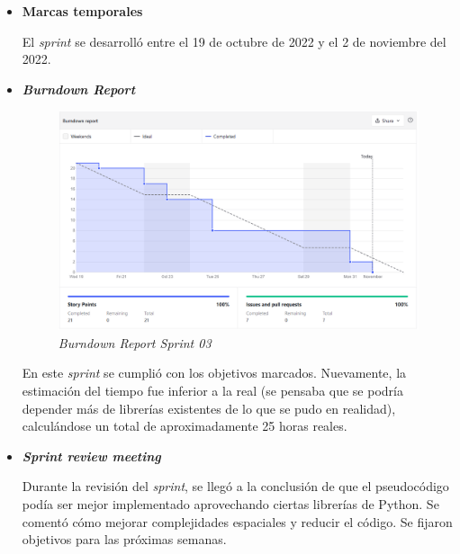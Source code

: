 \begin{itemize}
\begin{enumerate}
	\end{enumerate}
	
	\item \textbf{Marcas temporales}	
	
	El \textit{sprint} se desarrolló entre el 19 de octubre de 2022 y el 2 de noviembre del 2022.
	
	\item \textbf{\textit{Burndown Report}}
	
		\begin{figure}[h]
		\caption[\textit{Sprint} 03: \textit{burndown report}]{\textit{Burndown Report Sprint 03}}
		\centering
		\includegraphics[width=\textwidth]{../img/anexos/bdr/s03_bdr}
		\end{figure}
	
	En este \textit{sprint} se cumplió con los objetivos marcados. Nuevamente, la estimación del tiempo fue inferior a la real (se pensaba que se podría depender más de librerías existentes de lo que se pudo en realidad), calculándose un total de aproximadamente 25 horas reales.

	\item \textbf{\textit{Sprint review meeting}}
	
	Durante la revisión del \textit{sprint}, se llegó a la conclusión de que el pseudocódigo podía ser mejor implementado aprovechando ciertas librerías de Python. Se comentó cómo mejorar complejidades espaciales y reducir el código. Se fijaron objetivos para las próximas semanas.
	
\end{itemize}


